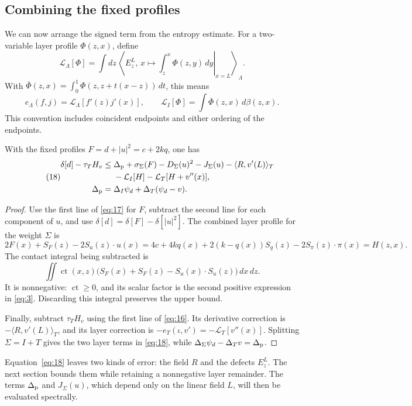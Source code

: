 \subsection{Combining the fixed profiles}

We can now arrange the signed term from the entropy estimate.
For a two-variable layer profile \(\Phi(z,x)\), define
\[
 \mathcal L_\Lambda[\Phi]
  =\int dz\,
    \left\langle E_z^L,\,
       \left.x\longmapsto\int_z^x\Phi(z,y)\,dy\right|_{x=L}
    \right\rangle_\Lambda .
\]
With
\(\overline\Phi(z,x)=\int_0^1\Phi(z,z+t(x-z))\,dt\), this means
\[
 e_\Lambda(f,j)=\mathcal L_\Lambda[f'(z)j'(x)],
 \qquad
 \mathcal L_I[\Phi]=\int\overline\Phi(z,x)\,d\beta(z,x).
\]
This convention includes coincident endpoints and either ordering
of the endpoints.

\begin{proposition}\label{prop:quadratic-decomposition}
 With the fixed profiles \(F=d+|u|^2=c+2kq\), one has
 \begin{equation}\tag{18}\label{eq:18}
 \begin{aligned}
  \delta[d]-\tau_T H_v
  \leq{}&\Delta_{\rm p}+\sigma_\Sigma(F)
       -D_\Sigma(u)^2-J_\Sigma(u)-\langle R,v'(L)\rangle_T\\
       &-\mathcal L_I[H]-\mathcal L_T[H+v''(x)],\\
  \Delta_{\rm p}
    ={}&\Delta_I\psi_d+\Delta_T(\psi_d-v).
 \end{aligned}
 \end{equation}
\end{proposition}

\begin{proof}
Use the first line of \eqref{eq:17} for \(F\), subtract the second
line for each component of \(u\), and use
\(\delta[d]=\delta[F]-\delta[|u|^2]\).
The combined layer profile for the weight \(\Sigma\) is
\[
 2F(x)+S_F(z)-2S_u(z)\cdot u(x)
 =4c+4kq(x)+2(k-q(x))S_q(z)-2S_\pi(z)\cdot\pi(x)
 =H(z,x).
\]
The contact integral being subtracted is
\[
 \iint \operatorname{ct}(x,z)
   \bigl(S_F(x)+S_F(z)-S_u(x)\cdot S_u(z)\bigr)\,dx\,dz.
\]
It is nonnegative: \(\operatorname{ct}\geq0\), and its scalar
factor is the second positive expression in \eqref{eq:3}.
Discarding this integral preserves the upper bound.

Finally, subtract \(\tau_TH_v\) using the first line of
\eqref{eq:16}. Its derivative correction is
\(-\langle R,v'(L)\rangle_T\), and its layer correction is
\(-e_T(\iota,v')=-\mathcal L_T[v''(x)]\).
Splitting \(\Sigma=I+T\) gives the two layer terms in
\eqref{eq:18}, while
\(\Delta_\Sigma\psi_d-\Delta_Tv=\Delta_{\rm p}\).
\end{proof}

Equation~\eqref{eq:18} leaves two kinds of error: the field \(R\) and
the defects \(E_z^L\). The next section bounds them while retaining a
nonnegative layer remainder. The terms \(\Delta_{\rm p}\) and
\(J_\Sigma(u)\), which depend only on the linear field \(L\), will
then be evaluated spectrally.
